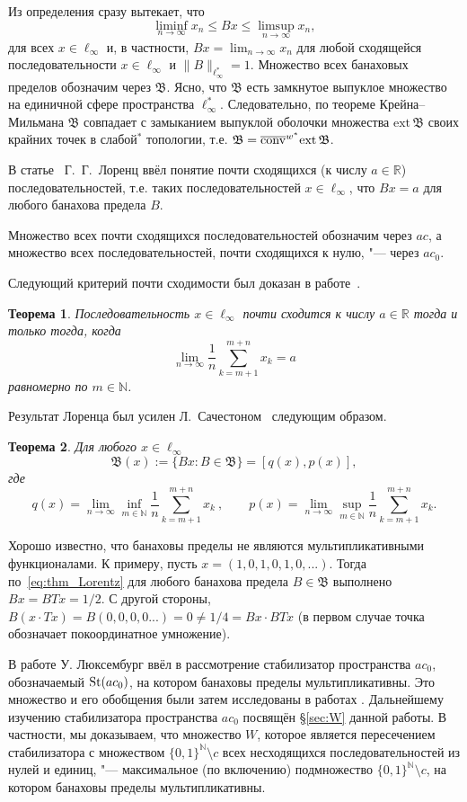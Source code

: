 \documentclass[12pt]{article}
\newtheorem{thm}{Теорема}
\def\N{{\mathbb{N}}}
\def\B{{\mathfrak{B}}}
\def\ext{{\mathrm{ext}\,}}
\begin{document}
Из определения сразу вытекает, что
$$\liminf_{n\to\infty}x_n \leqslant Bx \leqslant \limsup_{n\to\infty}x_n,$$
для всех $x\in \ell_\infty$ и, в частности,
 $\displaystyle
Bx=\lim_{n\to\infty}x_n$ для любой сходящейся
последовательности $x\in \ell_\infty$ и $\|B\|_{\ell_\infty^*}=1$. Множество всех банаховых пределов обозначим
 через $\mathfrak{B}$. Ясно, что $\mathfrak{B}$ есть замкнутое выпуклое
множество на единичной сфере пространства $\ell_\infty^*$. Следовательно, по теореме Крейна--Мильмана $\B$ совпадает с замыканием выпуклой оболочки множества $\ext \B$ своих крайних точек в слабой$^*$ топологии, т.е. $\B={\overline{\rm conv}}^{w^*} \ext \B$.

В статье~\cite{L} Г.~Г.~Лоренц ввёл понятие почти сходящихся (к числу $a\in \mathbb R$) последовательностей, т.е. таких последовательностей $x\in \ell_\infty$, что $Bx=a$ для любого банахова предела $B$.

Множество всех почти сходящихся последовательностей обозначим через $ac$,
а множество всех последовательностей, почти сходящихся к нулю, "--- через $ac_0$.

Следующий критерий почти сходимости был доказан в работе~\cite{L}.
\begin{thm}\label{lorentz}
Последовательность $x\in \ell_\infty$ почти сходится к числу $a\in \mathbb R$ тогда и только тогда, когда
\begin{equation}
	\label{eq:thm_Lorentz}
	\lim_{n\to\infty}\frac1n\sum_{k=m+1}^{m+n}x_k=a
\end{equation}
равномерно по $m\in{\mathbb N}$.
\end{thm}

Результат Лоренца был усилен Л.~Сачестоном~\cite{S} следующим образом.
\begin{thm}\label{sucheston}
Для любого $x\in \ell_\infty$
$$\mathfrak B (x):=\{Bx: B\in \mathfrak B\}=[q(x),p(x)],$$
где
$$
 q(x)=\lim_{n\to\infty}\inf_{m\in\mathbb N}
  \frac1n \sum_{k=m+1}^{m+n} x_k \ ,
\qquad
 p(x)=\lim_{n\to\infty}\sup_{m\in\mathbb N}
  \frac1n \sum_{k=m+1}^{m+n} x_k.
$$
\end{thm}

Хорошо известно, что банаховы пределы не являются мультипликативными функционалами.
К примеру, пусть $x=(1,0,1,0,1,0,...)$.
Тогда по~\eqref{eq:thm_Lorentz} для любого банахова предела $B\in\mathfrak{B}$ выполнено
$Bx = BTx = 1/2$.
С другой стороны, $B(x\cdot Tx) = B(0,0,0,0...) = 0 \neq 1/4 = Bx \cdot BTx$
(в первом случае точка обозначает покоординатное умножение).

В работе \cite{Luxemburg} У. Люксембург ввёл в рассмотрение стабилизатор пространства $ac_0$, обозначаемый ${\rm St}(ac_0)$,
на котором банаховы пределы мультипликативны.
Это множество и его обобщения были затем исследованы в работах \cite{Alekhno, SSU2, ASSU4}.
Дальнейшему изучению стабилизатора пространства $ac_0$ посвящён  \S\ref{sec:W} данной работы.
В частности, мы доказываем, что множество $W$,
которое является пересечением стабилизатора с множеством $\{0,1\}^\N \setminus c$
всех несходящихся последовательностей из нулей и единиц, "--- максимальное (по включению) подмножество $\{0,1\}^\N \setminus c$,
на котором банаховы пределы мультипликативны.
\end{document}

